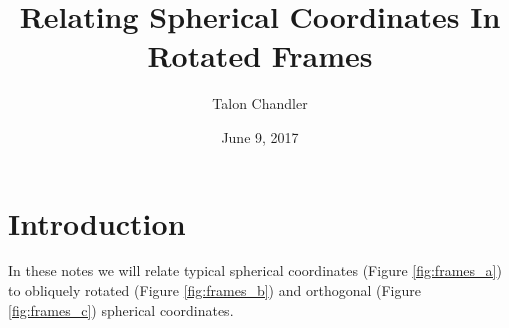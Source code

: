 \documentclass[11pt]{article}
\begin{document}
\title{\vspace{-2.5em} Relating Spherical Coordinates In Rotated Frames\vspace{-1em}} \author{Talon Chandler}%
\date{\vspace{-1em}June 9, 2017\vspace{-1em}}
\maketitle

\section{Introduction}
In these notes we will relate typical spherical coordinates (Figure
\ref{fig:frames_a}) to obliquely rotated (Figure \ref{fig:frames_b}) and
orthogonal (Figure \ref{fig:frames_c}) spherical coordinates.
\end{document}
